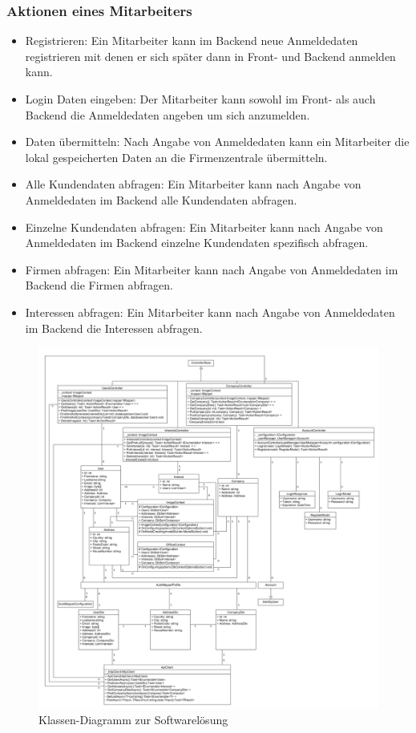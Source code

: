 \subsubsection{Aktionen eines Mitarbeiters}
\begin{itemize}
	\item Registrieren: Ein Mitarbeiter kann im Backend neue Anmeldedaten registrieren mit denen er sich später dann in Front- und Backend anmelden kann.
	\item Login Daten eingeben: Der Mitarbeiter kann sowohl im Front- als auch Backend die Anmeldedaten angeben um sich anzumelden.
	\item Daten übermitteln: Nach Angabe von Anmeldedaten kann ein Mitarbeiter die lokal gespeicherten Daten an die Firmenzentrale übermitteln.
	\item Alle Kundendaten abfragen: Ein Mitarbeiter kann nach Angabe von Anmeldedaten im Backend alle Kundendaten abfragen.
	\item Einzelne Kundendaten abfragen: Ein Mitarbeiter kann nach Angabe von Anmeldedaten im Backend einzelne Kundendaten spezifisch abfragen.
	\item Firmen abfragen: Ein Mitarbeiter kann nach Angabe von Anmeldedaten im Backend die Firmen abfragen.
	\item Interessen abfragen: Ein Mitarbeiter kann nach Angabe von Anmeldedaten im Backend die Interessen abfragen.
\end{itemize}
\newpage

\begin{figure}[h]
	\centering
	\includegraphics[width=1.1\linewidth]{Images/Projekt_Messe_Class1}
	\caption{Klassen-Diagramm zur Softwarelösung}
	\label{fig:projektmesseclass}
\end{figure}

